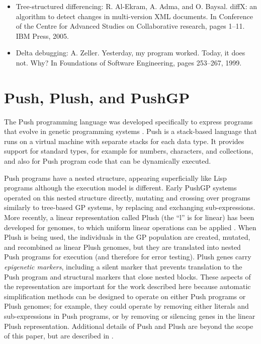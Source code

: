 \begin{itemize}
\item
Tree-structured differencing: R. Al-Ekram, A. Adma, and O. Baysal. diffX: an algorithm to detect changes in multi-version XML documents. In Conference of the Centre for Advanced Studies on Collaborative research, pages 1–11. IBM Press, 2005.

\item
Delta debugging: A. Zeller. Yesterday, my program worked. Today, it does not. Why? In Foundations of Software Engineering, pages 253–267, 1999.

\end{itemize}




\section{Push, Plush, and PushGP}
\label{sec:push}



The Push programming language was developed specifically to express programs that evolve in genetic programming systems \cite{spector2:2001:gecco, spector:2002:GPEM, 1068292}. Push is a stack-based language that runs on a virtual machine with separate stacks for each data type. It provides support for standard types, for example for numbers, characters, and collections, and also for Push program code that can be dynamically executed. 

Push programs have a nested structure, appearing superficially like Lisp programs although the execution model is different. Early PushGP systems operated on this nested structure directly, mutating and crossing over programs similarly to tree-based GP systems, by replacing and exchanging sub-expressions. More recently, a linear representation called Plush (the ``l'' is for linear) has been developed for genomes, to which uniform linear operations can be applied \cite{Helmuth:2016:GPTP}. When Plush is being used, the individuals in the GP population are created, mutated, and recombined as linear Plush genomes, but they are translated into nested Push programs for execution (and therefore for error testing). Plush genes carry {\it epigenetic markers}, including a {\ttfamily silent} marker that prevents translation to the Push program \cite{LaCava:2014:GPTP} and structural markers that close nested blocks. These aspects of the representation are important for the work described here because automatic simplification methods can be designed to operate on either Push programs or Plush genomes; for example, they could operate by removing either literals and sub-expressions in Push programs, or by removing or silencing genes in the linear Plush representation.
Additional details of Push and Plush are beyond the scope of this paper, but are described in \cite{Helmuth:2016:GPTP}.


